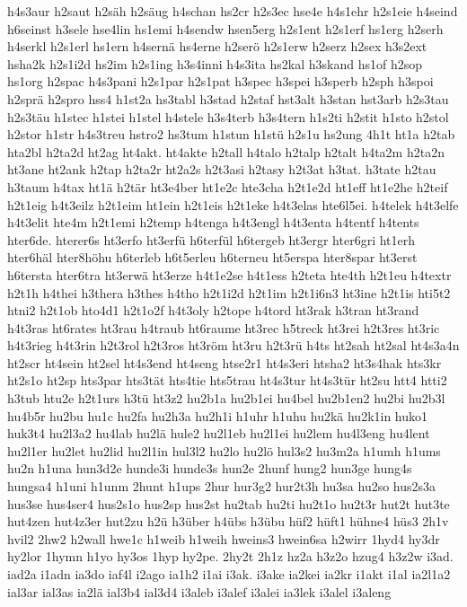 {h4s3aur
h2saut
h2säh
h2säug
h4schan
hs2cr
h2s3ec
hse4e
h4s1ehr
h2s1eie
h4seind
h6seinst
h3sele
hse4lin
hs1emi
h4sendw
hsen5erg
h2s1ent
h2s1erf
hs1erg
h2serh
h4serkl
h2s1erl
hs1ern
h4sernä
hs4erne
h2serö
h2s1erw
h2serz
h2sex
h3s2ext
hsha2k
h2s1i2d
hs2im
h2s1ing
h3s4inni
h4s3ita
hs2kal
h3skand
hs1of
h2sop
hs1org
h2spac
h4s3pani
h2s1par
h2s1pat
h3spec
h3spei
h3sperb
h2sph
h3spoi
h2sprä
h2spro
hss4
h1st2a
hs3tabl
h3stad
h2staf
hst3alt
h3stan
hst3arb
h2s3tau
h2s3täu
h1stec
h1stei
h1stel
h4stele
h3s4terb
h3s4tern
h1s2ti
h2stit
h1sto
h2stol
h2stor
h1str
h4s3treu
hstro2
hs3tum
h1stun
h1stü
h2s1u
hs2ung
4h1t
ht1a
h2tab
hta2bl
h2ta2d
ht2ag
ht4akt.
ht4akte
h2tall
h4talo
h2talp
h2talt
h4ta2m
h2ta2n
ht3ane
ht2ank
h2tap
h2ta2r
ht2a2s
h2t3asi
h2tasy
h2t3at
h3tat.
h3tate
h2tau
h3taum
h4tax
ht1ä
h2tär
ht3e4ber
ht1e2c
hte3cha
h2t1e2d
ht1eff
ht1e2he
h2teif
h2t1eig
h4t3eilz
h2t1eim
ht1ein
h2t1eis
h2t1eke
h4t3elas
hte6l5ei.
h4telek
h4t3elfe
h4t3elit
hte4m
h2t1emi
h2temp
h4tenga
h4t3engl
h4t3enta
h4tentf
h4tents
hter6de.
hterer6s
ht3erfo
ht3erfü
h6terfül
h6tergeb
ht3ergr
hter6gri
ht1erh
hter6häl
hter8höhu
h6terleb
h6t5erleu
h6terneu
ht5erspa
hter8spar
ht3erst
h6tersta
hter6tra
ht3erwä
ht3erze
h4t1e2se
h4t1ess
h2teta
hte4th
h2t1eu
h4textr
h2t1h
h4thei
h3thera
h3thes
h4tho
h2t1i2d
h2t1im
h2t1i6n3
ht3ine
h2t1is
hti5t2
htni2
h2t1ob
hto4d1
h2t1o2f
h4t3oly
h2tope
h4tord
ht3rak
h3tran
ht3rand
h4t3ras
ht6rates
ht3rau
h4traub
ht6raume
ht3rec
h5treck
ht3rei
h2t3res
ht3ric
h4t3rieg
h4t3rin
h2t3rol
h2t3ros
ht3röm
ht3ru
h2t3rü
h4ts
ht2sah
ht2sal
ht4s3a4n
ht2scr
ht4sein
ht2sel
ht4s3end
ht4seng
htse2r1
ht4s3eri
htsha2
ht3s4hak
hts3kr
ht2s1o
ht2sp
hts3par
hts3tät
hts4tie
hts5trau
ht4s3tur
ht4s3tür
ht2su
htt4
htti2
h3tub
htu2e
h2t1urs
h3tü
ht3z2
hu2b1a
hu2b1ei
hu4bel
hu2b1en2
hu2bi
hu2b3l
hu4b5r
hu2bu
hu1c
hu2fa
hu2h3a
hu2h1i
h1uhr
h1uhu
hu2kä
hu2k1in
huko1
huk3t4
hu2l3a2
hu4lab
hu2lä
hule2
hu2l1eb
hu2l1ei
hu2lem
hu4l3eng
hu4lent
hu2l1er
hu2let
hu2lid
hu2l1in
hul3l2
hu2lo
hu2lö
hul3s2
hu3m2a
h1umh
h1ums
hu2n
h1una
hun3d2e
hunde3i
hunde3s
hun2e
2hunf
hung2
hun3ge
hung4s
hungsa4
h1uni
h1unm
2hunt
h1ups
2hur
hur3g2
hur2t3h
hu3sa
hu2so
hus2s3a
hus3se
hus4ser4
hus2s1o
hus2sp
hus2st
hu2tab
hu2ti
hu2t1o
hu2t3r
hut2t
hut3te
hut4zen
hut4z3er
hut2zu
h2ü
h3über
h4übs
h3übu
hüf2
hüft1
hühne4
hüs3
2h1v
hvil2
2hw2
h2wall
hwe1c
h1weib
h1weih
hweins3
hwein6sa
h2wirr
1hyd4
hy3dr
hy2lor
1hymn
h1yo
hy3os
1hyp
hy2pe.
2hy2t
2h1z
hz2a
h3z2o
hzug4
h3z2w
i3ad.
iad2a
i1adn
ia3do
iaf4l
i2ago
ia1h2
i1ai
i3ak.
i3ake
ia2kei
ia2kr
i1akt
i1al
ia2l1a2
ial3ar
ial3as
ia2lä
ial3b4
ial3d4
i3aleb
i3alef
i3alei
ia3lek
i3alel
i3aleng
}
